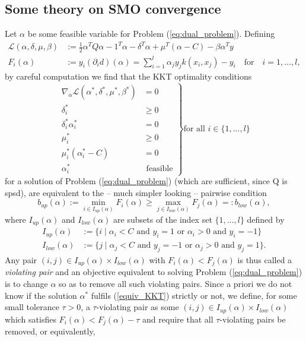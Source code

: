 \subsection{Some theory on SMO convergence}
Let $\alpha$ be some feasible variable for Problem (\ref{eq:dual_problem}). Defining
\begin{align*}
\mathcal{L}(\alpha,\delta,\mu,\beta) &:= \frac{1}{2} \alpha^T Q \alpha - 1^T \alpha - \delta^T\alpha + \mu^T(\alpha - C) - \beta \alpha^T y \\
F_i(\alpha) &:= y_i (\partial_i d)(\alpha) = \sum_{i = 1}^l \alpha_j y_j k(x_i,x_j) - y_i \quad \text{for} \quad i = 1,\ldots,l,
\end{align*}
by careful computation we find that the KKT optimality conditions
\begin{equation*}
\left.
\begin{aligned}
\nabla_{\alpha} \mathcal{L}(\alpha^*,\delta^*,\mu^*,\beta^*) &= 0\\
\delta_i^* &\geq 0\\
\delta_i^* \alpha_i^* &= 0\\
\mu_i^* &\geq 0\\
\mu_i^* (\alpha_i^*-C) &= 0\\
\alpha_i^* &\text{ feasible}
\end{aligned}
\right\} \text{for all } i \in \{1,\ldots,l\}
\end{equation*}
for a solution of Problem (\ref{eq:dual_problem}) (which are sufficient, since Q is spsd), are equivalent to the -- much simpler looking -- pairwise condition
\begin{equation*}\label{equiv_KKT}
b_{up}(\alpha) := \min_{i \in I_{up}(\alpha)} F_i(\alpha) \geq \max_{j \in I_{low}(\alpha)} F_j(\alpha) =: b_{low}(\alpha),
\end{equation*}
where $I_{up}(\alpha)$ and $I_{low}(\alpha)$ are subsets of the index set $\{1,\ldots,l\}$ defined by
\begin{align*}
I_{up}(\alpha) &:= \{ i  \mid  \alpha_i < C \text{ and } y_i = 1 \text{ or } \alpha_i > 0 \text{ and } y_i = -1 \} \\
I_{low}(\alpha) &:= \{ j \mid \alpha_j < C \text{ and } y_j = -1 \text{ or } \alpha_j > 0 \text{ and } y_j = 1 \}.
\end{align*} 
Any pair $(i,j) \in I_{up}(\alpha) \times I_{low}(\alpha)$ with $F_i(\alpha) < F_j(\alpha)$ is thus called a \textit{violating pair} and an objective equivalent to solving Problem (\ref{eq:dual_problem}) is to change $\alpha$ so as to remove all such violating pairs. Since a priori we do not know if the solution $\alpha^*$ fulfils (\ref{equiv_KKT}) strictly or not, we define, for some small tolerance $\tau > 0$, a $\tau$-violating pair as some $(i,j) \in I_{up}(\alpha) \times I_{low}(\alpha)$ which satisfies $F_i(\alpha) < F_j(\alpha) - \tau$ and require that all $\tau$-violating pairs be removed, or equivalently, 
